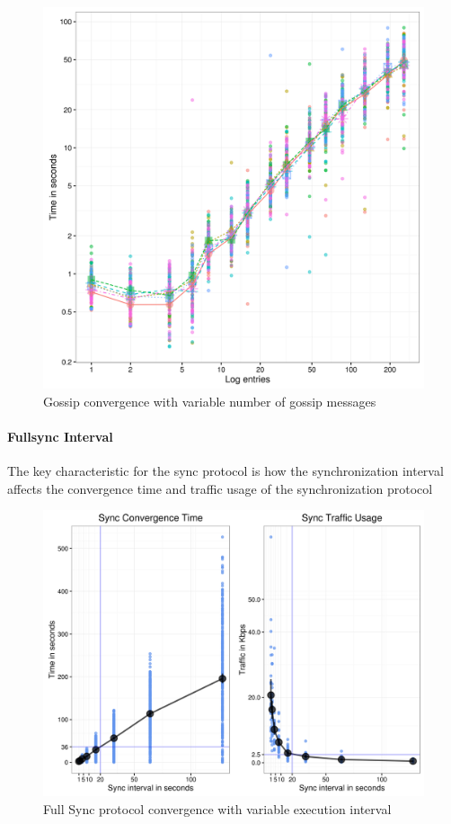 \documentclass{sig-alternate}
\begin{document}
\begin{figure}[htp]
\centering
\includegraphics[width=\columnwidth]{../eval/plots/gossip.png}
\caption{Gossip convergence with variable number of gossip messages}
\label{fig:gossip}
\end{figure}

\paragraph{Fullsync Interval}

The key characteristic for the sync protocol is how the synchronization interval affects the convergence time and traffic usage of the synchronization protocol

\begin{figure}[htp]
\centering
\includegraphics[width=\columnwidth]{../eval/plots/sync.png}
\caption{Full Sync protocol convergence with variable execution interval}
\label{fig:sync}
\end{figure}
\end{document}
